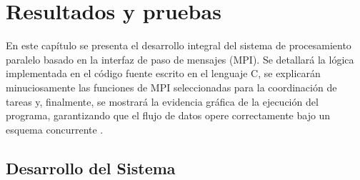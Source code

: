 ﻿%




\chapter{Resultados y pruebas}

En este capítulo se presenta el desarrollo integral del sistema de procesamiento paralelo basado en la interfaz de paso de mensajes (MPI). Se detallará la lógica implementada en el código fuente escrito en el lenguaje C, se explicarán minuciosamente las funciones de MPI seleccionadas para la coordinación de tareas y, finalmente, se mostrará la evidencia gráfica de la ejecución del programa, garantizando que el flujo de datos opere correctamente bajo un esquema concurrente \cite{ref2_frem}.

\section{Desarrollo del Sistema}

%
%
%

